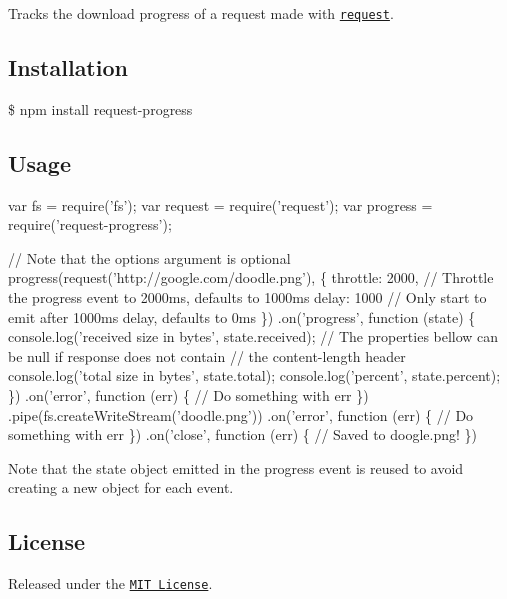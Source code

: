 Tracks the download progress of a request made with \href{https://github.com/mikeal/request}{\tt request}.

\subsection*{Installation}

{\ttfamily \$ npm install request-\/progress}

\subsection*{Usage}


\begin{DoxyCode}
var fs = require(\textcolor{stringliteral}{'fs'});
var request = require(\textcolor{stringliteral}{'request'});
var progress = require(\textcolor{stringliteral}{'request-progress'});

\textcolor{comment}{// Note that the options argument is optional}
progress(request(\textcolor{stringliteral}{'http://google.com/doodle.png'}), \{
    throttle: 2000,  \textcolor{comment}{// Throttle the progress event to 2000ms, defaults to 1000ms}
    delay: 1000      \textcolor{comment}{// Only start to emit after 1000ms delay, defaults to 0ms}
\})
.on(\textcolor{stringliteral}{'progress'}, \textcolor{keyword}{function} (state) \{
    console.log(\textcolor{stringliteral}{'received size in bytes'}, state.received);
    \textcolor{comment}{// The properties bellow can be null if response does not contain}
    \textcolor{comment}{// the content-length header}
    console.log(\textcolor{stringliteral}{'total size in bytes'}, state.total);
    console.log(\textcolor{stringliteral}{'percent'}, state.percent);
\})
.on(\textcolor{stringliteral}{'error'}, \textcolor{keyword}{function} (err) \{
    \textcolor{comment}{// Do something with err}
\})
.pipe(fs.createWriteStream(\textcolor{stringliteral}{'doodle.png'}))
.on(\textcolor{stringliteral}{'error'}, \textcolor{keyword}{function} (err) \{
    \textcolor{comment}{// Do something with err}
\})
.on(\textcolor{stringliteral}{'close'}, \textcolor{keyword}{function} (err) \{
    \textcolor{comment}{// Saved to doogle.png!}
\})
\end{DoxyCode}


Note that the {\ttfamily state} object emitted in the {\ttfamily progress} event is reused to avoid creating a new object for each event.

\subsection*{License}

Released under the \href{http://www.opensource.org/licenses/mit-license.php}{\tt M\+I\+T License}. 